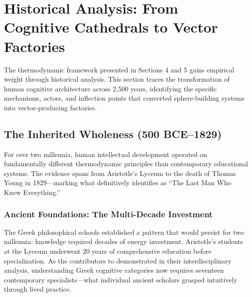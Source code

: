 %
%
%
%

\section{Historical Analysis: From Cognitive Cathedrals to Vector Factories}
\label{sec:historical}

The thermodynamic framework presented in Sections 4 and 5 gains empirical weight through historical analysis. This section traces the transformation of human cognitive architecture across 2,500 years, identifying the specific mechanisms, actors, and inflection points that converted sphere-building systems into vector-producing factories.

\subsection{The Inherited Wholeness (500 BCE--1829)}

For over two millennia, human intellectual development operated on fundamentally different thermodynamic principles than contemporary educational systems. The evidence spans from Aristotle's Lyceum to the death of Thomas Young in 1829---marking what \citet{robinson2006} definitively identifies as ``The Last Man Who Knew Everything.''

\subsubsection{Ancient Foundations: The Multi-Decade Investment}

The Greek philosophical schools established a pattern that would persist for two millennia: knowledge required decades of energy investment. Aristotle's students at the Lyceum underwent 20 years of comprehensive education before specialization. As the contributors to \citet{mouzala2024} demonstrated in their interdisciplinary analysis, understanding Greek cognitive categories now requires seventeen contemporary specialists---what individual ancient scholars grasped intuitively through lived practice.

